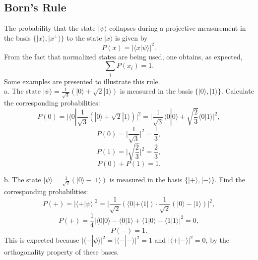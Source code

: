 \documentclass[a4paper]{article}
\begin{document}
\subsection{Born's Rule}
The probability that the state $|\psi\rangle$ collapses during a projective measurement in the basis $\{|x\rangle, |x^\perp \rangle \}$ to the state $|x\rangle$ is given by
\begin{equation}
P(x)=|\langle x|\psi\rangle|^2.
\end{equation}
From the fact that normalized states are being used, one obtains, as expected,
\begin{equation}
\sum_i P(x_i)=1.
\end{equation}
Some examples are presented to illustrate this rule.\\

\noindent a. The state $|\psi\rangle=\frac{1}{\sqrt{3}}(|0\rangle +\sqrt{2}|1\rangle)$ is measured in the basis $\{|0\rangle, |1\rangle \}$. Calculate the corresponding probabilities:
\begin{equation*}
P(0)=\bigg |\langle 0|\frac{1}{\sqrt{3}}(|0\rangle +\sqrt{2}|1\rangle)\bigg |^2=\bigg|\frac{1}{\sqrt{3}}\langle 0|0\rangle+\sqrt{\frac{2}{3}}\langle 0|1\rangle \bigg |^2,
\end{equation*}
\begin{equation*}
P(0)=\bigg|\frac{1}{\sqrt{3}} \bigg|^2=\frac{1}{3},
\end{equation*}
\begin{equation*}
P(1)=\bigg|\sqrt{\frac{2}{3}} \bigg|^2=\frac{2}{3},
\end{equation*}
\begin{equation*}
P(0)+P(1)=1.
\end{equation*}

\noindent b. The state $|\psi\rangle=\frac{1}{\sqrt{2}}(|0\rangle-|1\rangle)$ is measured in the basis $\{|+\rangle, |-\rangle\}$. Find the corresponding probabilities:
\begin{equation*}
P(+)=\bigg| \langle +|\psi\rangle\bigg|^2=\bigg|\frac{1}{\sqrt{2}}(\langle 0| +\langle 1|)\cdot \frac{1}{\sqrt{2}}(|0\rangle -|1\rangle)\bigg|^2,
\end{equation*}
\begin{equation*}
P(+)=\frac{1}{4}\bigg|\langle 0|0\rangle-\langle 0|1\rangle+\langle 1|0\rangle-\langle 1|1\rangle\bigg|^2=0,
\end{equation*}
\begin{equation*}
P(-)=1.
\end{equation*}
This is expected because $\big| \langle -|\psi\rangle\big|^2=\big| \langle -|-\rangle\big|^2=1$ and $\big| \langle +|-\rangle\big|^2=0$, by the orthogonality property of these bases.
\end{document}
